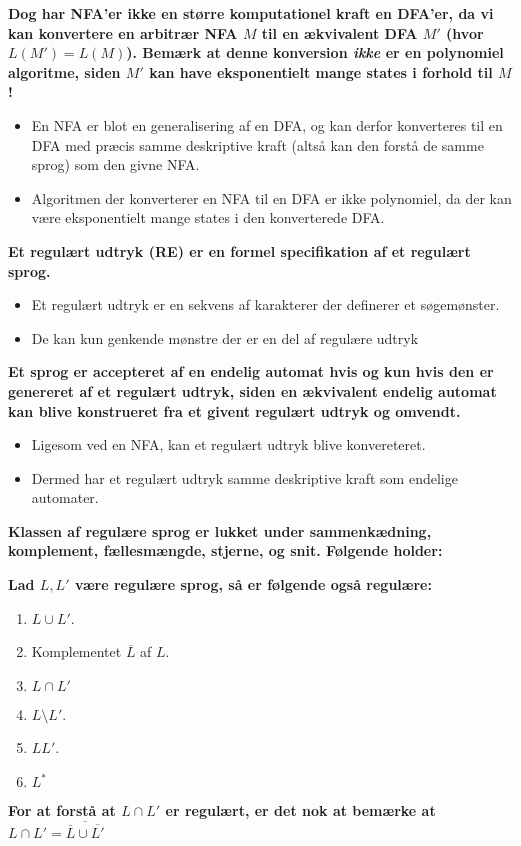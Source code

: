 \noindent
\textbf{Dog har NFA'er ikke en større komputationel kraft en DFA'er, da vi kan konvertere en arbitrær NFA $M$ til en ækvivalent DFA $M'$ (hvor $L(M') = L(M)$). Bemærk at denne konversion \textit{ikke} er en polynomiel algoritme, siden $M'$ kan have eksponentielt mange states i forhold til $M$!}
\begin{itemize}
  \item En NFA er blot en generalisering af en DFA, og kan derfor konverteres til en DFA med præcis samme deskriptive kraft (altså kan den forstå de samme sprog) som den givne NFA.
  \item Algoritmen der konverterer en NFA til en DFA er ikke polynomiel, da der kan være eksponentielt mange states i den konverterede DFA.
\end{itemize}
\noindent
\textbf{Et regulært udtryk (RE) er en formel specifikation af et regulært sprog.}\\
\begin{itemize}
  \item Et regulært udtryk er en sekvens af karakterer der definerer et søgemønster.
  \item De kan kun genkende mønstre der er en del af regulære udtryk
\end{itemize}
\noindent
\textbf{Et sprog er accepteret af en endelig automat hvis og kun hvis den er genereret af et regulært udtryk, siden en ækvivalent endelig automat kan blive konstrueret fra et givent regulært udtryk og omvendt.}
\begin{itemize}
  \item Ligesom ved en NFA, kan et regulært udtryk blive konvereteret.
  \item Dermed har et regulært udtryk samme deskriptive kraft som endelige automater.
\end{itemize}
\textbf{Klassen af regulære sprog er lukket under sammenkædning, komplement, fællesmængde, stjerne, og snit. Følgende holder:}

\textbf{Lad $L, L'$ være regulære sprog, så er følgende også regulære:}
\begin{enumerate}
  \item $L \cup L'$.
  \item Komplementet $\overline{L}$ af $L$.
  \item $L \cap L'$
  \item $L \setminus L'$.
  \item $LL'$.
  \item $L^{*}$
\end{enumerate}
\textbf{For at forstå at $L \cap L'$ er regulært, er det nok at bemærke at $L \cap L' = \overline{\overline{L} \cup \overline{L'}}$}

